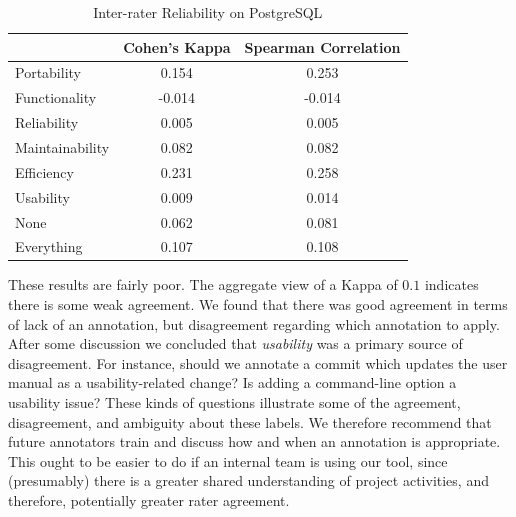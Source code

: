\documentclass[smallextended]{svjour3}       %
\begin{document}


\begin{table}
\centering
\begin{tabular}{l|c|c}
\hline
            & Cohen's Kappa & Spearman Correlation \\ \hline
Portability & 0.154 & 0.253  \\
Functionality & -0.014 & -0.014 \\
Reliability & 0.005 & 0.005 \\
Maintainability & 0.082 & 0.082 \\
Efficiency & 0.231 & 0.258 \\
Usability & 0.009 & 0.014 \\
None &      0.062 & 0.081 \\ \hline 
Everything & 0.107 & 0.108 \\ \hline
\end{tabular}
\caption{Inter-rater Reliability on PostgreSQL}
\label{tab:interr}
\end{table}

 

These results are fairly poor. The aggregate view of a Kappa of
$0.1$ indicates there is some weak agreement. We found that
there was good agreement in terms of lack of an annotation, but
disagreement regarding which annotation to apply. After some discussion we concluded that 
\emph{usability} was a primary source of
disagreement. For instance, should we annotate a commit which updates the user manual as a usability-related change? Is adding a command-line
option a usability issue? These kinds of questions illustrate some of
the agreement, disagreement, and ambiguity about these labels. 
We therefore recommend that future annotators train and discuss how and when an annotation is appropriate. This ought to be
easier to do if an internal team is using our tool, since (presumably) there is a greater shared understanding of project activities, and therefore,
potentially greater rater agreement.
\end{document}
